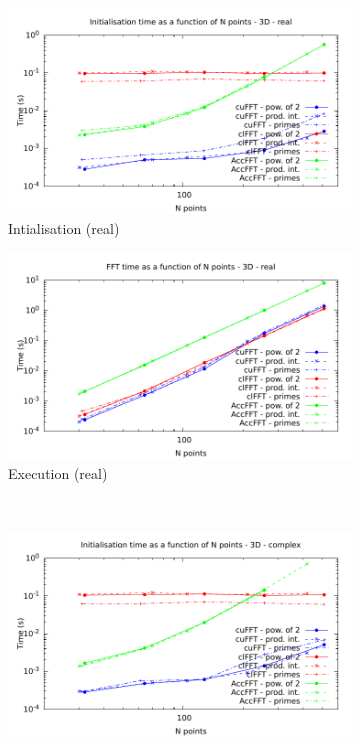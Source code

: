 \documentclass[12pt, a4paper]{article}
\begin{document}
\begin{figure}[H]
\captionsetup{width=0.8\linewidth}
\centering
\begin{subfigure}{.5\textwidth}
\centering
\includegraphics[width=.9\linewidth]{graphs/fft-3d-r-init.pdf}
\caption{Intialisation (real)}
\label{FFT3DRI}
\end{subfigure}%
\begin{subfigure}{.5\textwidth}
\centering
\includegraphics[width=.9\linewidth]{graphs/fft-3d-r-exec.pdf}
\caption{Execution (real)}
\label{FFT3DRE}
\end{subfigure}\\
\begin{subfigure}{.5\textwidth}
\centering
\includegraphics[width=.9\linewidth]{graphs/fft-3d-c-init.pdf}

\end{subfigure}
\end{figure}
\end{document}
